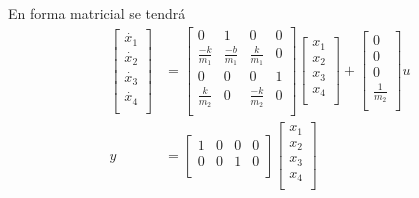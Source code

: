\documentclass[12pt]{article}
\begin{document}
\begin{itemize}
    En forma matricial se tendrá
    \begin{equation}
        \begin{split}
            \begin{bmatrix}
                \dot{x_{1}} \\
                \dot{x_{2}} \\
                \dot{x_{3}} \\
                \dot{x_{4}} \\
            \end{bmatrix}&=
            \begin{bmatrix}
                0 & 1 & 0 & 0\\
                \frac{-k}{m_{1}} & \frac{-b}{m_{1}} & \frac{k}{m_{1}} & 0\\
                0 & 0 & 0 & 1\\
                \frac{k}{m_{2}} & 0 & \frac{-k}{m_{2}} & 0\\
            \end{bmatrix}
            \begin{bmatrix}
                x_{1} \\
                x_{2} \\
                x_{3} \\
                x_{4} \\
            \end{bmatrix}+
            \begin{bmatrix}
                0 \\
                0 \\
                0 \\
                \frac{1}{m_{2}} \\
            \end{bmatrix}u\\
            y&=
            \begin{bmatrix}
                1 & 0 & 0 & 0\\
                0 & 0 & 1 & 0\\
            \end{bmatrix}
            \begin{bmatrix}
                x_{1} \\
                x_{2} \\
                x_{3} \\
                x_{4} \\
            \end{bmatrix}\\
        \label{eq:state_ejem22}
        \end{split}
    \end{equation}


\end{itemize}
\end{document}

